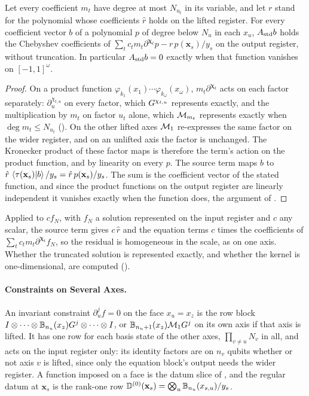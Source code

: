 \begin{proposition}
\label{prop:multi-axis}
Let every coefficient $m_t$ have degree at most $N_{u_t}$ in its variable, and let $r$ stand for the polynomial whose coefficients $\hat r$ holds on the lifted register. For every coefficient vector $b$ of a polynomial $p$ of degree below $N_u$ in each $x_u$, $A_{\mathrm{std}} b$ holds the Chebyshev coefficients of $\sum_tc_tm_t\partial^{\boldsymbol\chi_t}p-r\,p(\mathbf x_s)/y_s$ on the output register, without truncation. In particular $A_{\mathrm{std}} b=0$ exactly when that function vanishes on $[-1,1]^\omega$.
\end{proposition}
\begin{proof}
On a product function $\varphi_{k_1}(x_1)\cdots\varphi_{k_\omega}(x_\omega)$, $m_t\partial^{\boldsymbol\chi_t}$ acts on each factor separately: $\partial_u^{\chi_{t,u}}$ on every factor, which $G^{\chi_{t,u}}$ represents exactly, and the multiplication by $m_t$ on factor $u_t$ alone, which $\mathcal{M}_{m_t}$ represents exactly when $\deg m_t\le N_{u_t}$ (). On the other lifted axes $\mathcal{M}_1$ re-expresses the same factor on the wider register, and on an unlifted axis the factor is unchanged. The Kronecker product of these factor maps is therefore the term's action on the product function, and by linearity on every $p$. The source term maps $b$ to $\hat r\,\braket{\tau(\mathbf x_s)|b}/y_s=\hat r\,p(\mathbf x_s)/y_s$. The sum is the coefficient vector of the stated function, and since the product functions on the output register are linearly independent it vanishes exactly when the function does, the argument of .
\end{proof}
Applied to $cf_N$, with $f_N$ a solution represented on the input register and $c$ any scalar, the source term gives $c\,\hat r$ and the equation terms $c$ times the coefficients of $\sum_tc_tm_t\partial^{\boldsymbol\chi_t}f_N$, so the residual is homogeneous in the scale, as on one axis. Whether the truncated solution is represented exactly, and whether the kernel is one-dimensional, are computed ().

\paragraph{Constraints on Several Axes.} An invariant constraint $\partial_u^{j}f=0$ on the face $x_u=x_z$ is the row block $I\otimes\dots\otimes\mathbb{B}_{n_u}(x_z)G^{j}\otimes\dots\otimes I$, or $\mathbb{B}_{n_u+1}(x_z)\mathcal{M}_1G^{j}$ on its own axis if that axis is lifted. It has one row for each basis state of the other axes, $\prod_{v\ne u}N_v$ in all, and acts on the input register only: its identity factors are on $n_v$ qubits whether or not axis $v$ is lifted, since only the equation block's output needs the wider register. A function imposed on a face is the datum slice of , and the regular datum at $\mathbf x_s$ is the rank-one row $\mathbb{D}^{(0)}(\mathbf x_s)=\bigotimes_u\mathbb{B}_{n_u}(x_{s,u})/y_s$.

